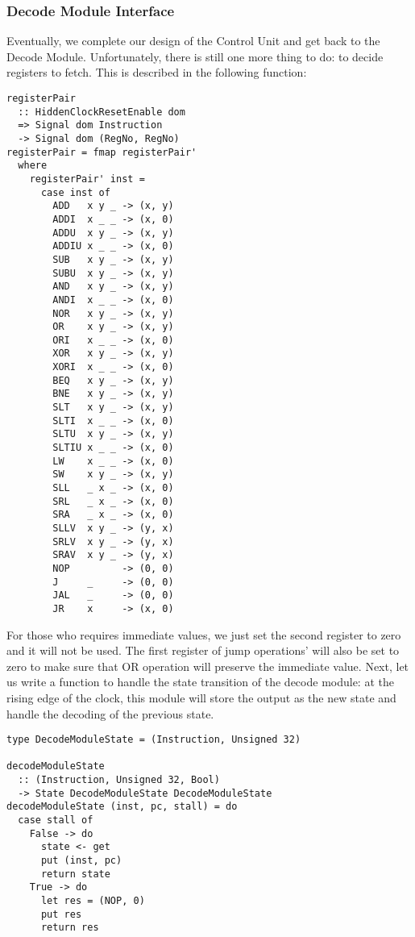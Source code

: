\subsubsection{Decode Module Interface}
Eventually, we complete our design of the Control Unit and get back to the Decode Module. Unfortunately, there is still one more thing to do: to decide registers to fetch. This is described in the following function:
\begin{verbatim}
registerPair 
  :: HiddenClockResetEnable dom
  => Signal dom Instruction
  -> Signal dom (RegNo, RegNo)
registerPair = fmap registerPair'
  where
    registerPair' inst =
      case inst of
        ADD   x y _ -> (x, y)
        ADDI  x _ _ -> (x, 0)
        ADDU  x y _ -> (x, y)
        ADDIU x _ _ -> (x, 0)
        SUB   x y _ -> (x, y)
        SUBU  x y _ -> (x, y)
        AND   x y _ -> (x, y)
        ANDI  x _ _ -> (x, 0)
        NOR   x y _ -> (x, y)
        OR    x y _ -> (x, y)
        ORI   x _ _ -> (x, 0)
        XOR   x y _ -> (x, y)
        XORI  x _ _ -> (x, 0)
        BEQ   x y _ -> (x, y)
        BNE   x y _ -> (x, y)
        SLT   x y _ -> (x, y)
        SLTI  x _ _ -> (x, 0)
        SLTU  x y _ -> (x, y)
        SLTIU x _ _ -> (x, 0)
        LW    x _ _ -> (x, 0)
        SW    x y _ -> (x, y)
        SLL   _ x _ -> (x, 0)
        SRL   _ x _ -> (x, 0)
        SRA   _ x _ -> (x, 0)
        SLLV  x y _ -> (y, x)
        SRLV  x y _ -> (y, x)
        SRAV  x y _ -> (y, x)
        NOP         -> (0, 0)
        J     _     -> (0, 0)
        JAL   _     -> (0, 0)
        JR    x     -> (x, 0)
\end{verbatim}
For those who requires immediate values, we just set the second register to zero and it will not be used. The first register of jump operations' will also be set to zero to make sure that OR operation will preserve the immediate value.
Next, let us write a function to handle the state transition of the decode module: at the rising edge of the clock, this module will store the output as the new state and handle the decoding of the previous state.
\begin{verbatim}
type DecodeModuleState = (Instruction, Unsigned 32)

decodeModuleState 
  :: (Instruction, Unsigned 32, Bool)
  -> State DecodeModuleState DecodeModuleState
decodeModuleState (inst, pc, stall) = do
  case stall of
    False -> do
      state <- get
      put (inst, pc)
      return state
    True -> do
      let res = (NOP, 0)
      put res
      return res
\end{verbatim}
